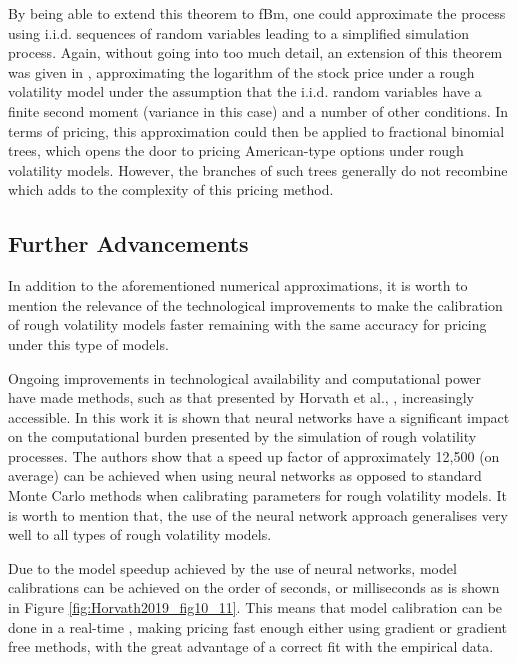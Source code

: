 \documentclass[12pt,oneside]{article}
\begin{document}
By being able to extend this theorem to fBm, one could approximate the process using i.i.d. sequences of random variables leading to a simplified simulation process. Again, without going into too much detail, an extension of this theorem was given in \cite{Horvath2017}, approximating the logarithm of the stock price under a rough volatility model under the assumption that the i.i.d. random variables have a finite second moment (variance in this case) and a number of other conditions. In terms of pricing, this approximation could then be applied to fractional binomial trees, which opens the door to pricing American-type options under rough volatility models. However, the branches of such trees generally do not recombine which adds to the complexity of this pricing method.   

\subsection{Further Advancements}
\label{subsec:tech_advancement}

In addition to the aforementioned numerical approximations, it is worth to mention the relevance of the technological improvements to make the calibration of rough volatility models faster remaining with the same accuracy for pricing under this type of models.

 Ongoing improvements in technological availability and computational power have made methods, such as that presented by Horvath et al., \cite{Horvath2019}, increasingly accessible. In this work it is shown that neural networks have a significant impact on the computational burden presented by the simulation of rough volatility processes. The authors show that a speed up factor of approximately 12,500 (on average) can be achieved when using neural networks as opposed to standard Monte Carlo methods when calibrating parameters for rough volatility models. It is worth to mention that, the use of the neural network approach generalises very well to all types of rough volatility models. 
 
 Due to the model speedup achieved by the use of neural networks, model calibrations can be achieved on the order of seconds, or milliseconds as is shown in Figure \ref{fig:Horvath2019_fig10_11}. This means that model calibration can be done in a real-time , making pricing fast enough either using gradient or gradient free methods, with the great advantage of a correct fit with the empirical data.
 
\end{document}
